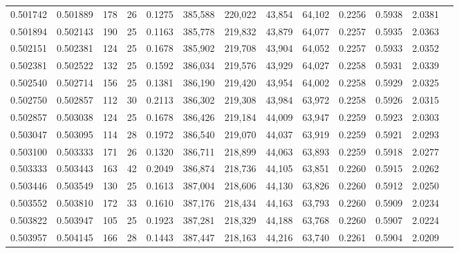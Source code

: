 \begin{tabular}{rrrrrrrrrrrrr}
0.501742 & 0.501889 &    178 &    26 &                                     0.1275 & 385,588 & 220,022 &  43,854 &  64,102 & 0.2256 & 0.5938 & 2.0381 \\
0.501894 & 0.502143 &    190 &    25 &                                     0.1163 & 385,778 & 219,832 &  43,879 &  64,077 & 0.2257 & 0.5935 & 2.0363 \\
0.502151 & 0.502381 &    124 &    25 &                                     0.1678 & 385,902 & 219,708 &  43,904 &  64,052 & 0.2257 & 0.5933 & 2.0352 \\
0.502381 & 0.502522 &    132 &    25 &                                     0.1592 & 386,034 & 219,576 &  43,929 &  64,027 & 0.2258 & 0.5931 & 2.0339 \\
0.502540 & 0.502714 &    156 &    25 &                                     0.1381 & 386,190 & 219,420 &  43,954 &  64,002 & 0.2258 & 0.5929 & 2.0325 \\
0.502750 & 0.502857 &    112 &    30 &                                     0.2113 & 386,302 & 219,308 &  43,984 &  63,972 & 0.2258 & 0.5926 & 2.0315 \\
0.502857 & 0.503038 &    124 &    25 &                                     0.1678 & 386,426 & 219,184 &  44,009 &  63,947 & 0.2259 & 0.5923 & 2.0303 \\
0.503047 & 0.503095 &    114 &    28 &                                     0.1972 & 386,540 & 219,070 &  44,037 &  63,919 & 0.2259 & 0.5921 & 2.0293 \\
0.503100 & 0.503333 &    171 &    26 &                                     0.1320 & 386,711 & 218,899 &  44,063 &  63,893 & 0.2259 & 0.5918 & 2.0277 \\
0.503333 & 0.503443 &    163 &    42 &                                     0.2049 & 386,874 & 218,736 &  44,105 &  63,851 & 0.2260 & 0.5915 & 2.0262 \\
0.503446 & 0.503549 &    130 &    25 &                                     0.1613 & 387,004 & 218,606 &  44,130 &  63,826 & 0.2260 & 0.5912 & 2.0250 \\
0.503552 & 0.503810 &    172 &    33 &                                     0.1610 & 387,176 & 218,434 &  44,163 &  63,793 & 0.2260 & 0.5909 & 2.0234 \\
0.503822 & 0.503947 &    105 &    25 &                                     0.1923 & 387,281 & 218,329 &  44,188 &  63,768 & 0.2260 & 0.5907 & 2.0224 \\
0.503957 & 0.504145 &    166 &    28 &                                     0.1443 & 387,447 & 218,163 &  44,216 &  63,740 & 0.2261 & 0.5904 & 2.0209 \\

\end{tabular}
